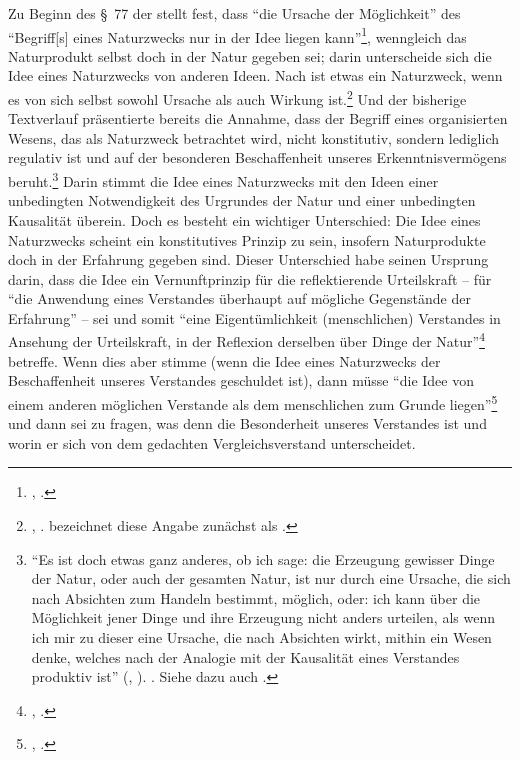 Zu Beginn des \S~77 der  stellt
 fest, dass \enquote{die Ursache der Möglichkeit} des
\enquote{Begriff[s] eines Naturzwecks {\punkt} nur in der Idee liegen
kann}\footnote{\cite[][\S~77]{Kant:KritikderUrteilskraft2009}, \cite[][V:
405.9--12]{Kant:GesammelteWerke1900ff.}.}, wenngleich das
Naturprodukt selbst doch in der Natur gegeben sei; darin unterscheide sich die
Idee eines Naturzwecks von anderen Ideen.
Nach  ist etwas ein Naturzweck, wenn es von sich selbst
sowohl Ursache als auch Wirkung
ist.\footnote{\cite[Vgl.][\S~64]{Kant:KritikderUrteilskraft2009},
\cite[][V: 370.35--37]{Kant:GesammelteWerke1900ff.}. 
bezeichnet diese Angabe zunächst als .}
Und der bisherige Textverlauf präsentierte bereits die Annahme, dass der Begriff
eines organisierten Wesens, das als Naturzweck betrachtet wird, nicht
konstitutiv, sondern lediglich regulativ
ist und auf der besonderen Beschaffenheit unseres Erkenntnisvermögens
beruht.\footnote{\enquote{Es ist doch etwas ganz anderes, ob ich sage: die
Erzeugung gewisser Dinge der Natur, oder auch der gesamten Natur, ist nur durch
eine Ursache, die sich nach Absichten zum Handeln bestimmt, möglich, oder: ich
kann 
über die Möglichkeit jener Dinge und ihre Erzeugung nicht anders urteilen, als
wenn ich mir zu dieser eine Ursache, die nach Absichten wirkt, mithin ein Wesen
denke, welches nach der Analogie mit der Kausalität eines Verstandes produktiv
ist} \mkbibparens{\cite[][\S~75]{Kant:KritikderUrteilskraft2009},
\cite[][V: 397.31--398.3]{Kant:GesammelteWerke1900ff.}}.
\cite[Vgl.][\pno~385\,f.]{Guyer:FromNaturetoMorality2001}.
Siehe dazu auch \cite{Stolzenberg:OrganismusundUrteilskraft2001}.}
Darin stimmt die Idee eines Naturzwecks mit den Ideen einer
unbedingten Notwendigkeit des Urgrundes der Natur und einer unbedingten
Kausalität überein. Doch es besteht ein wichtiger Unterschied: Die Idee eines
Naturzwecks scheint ein konstitutives Prinzip zu sein, insofern Naturprodukte
doch in der Erfahrung gegeben sind. Dieser Unterschied habe seinen Ursprung
darin, dass die Idee ein Vernunftprinzip für die reflektierende Urteilskraft --
für \enquote{die Anwendung eines Verstandes überhaupt auf mögliche Gegenstände
der Erfahrung} -- sei und somit \enquote{eine Eigentümlichkeit 
(menschlichen) Verstandes in Ansehung der Urteilskraft, in der Reflexion
derselben über Dinge der
Natur}\footnote{\cite[][\S~77]{Kant:KritikderUrteilskraft2009}, \cite[][V:
405.25--27]{Kant:GesammelteWerke1900ff.}.} betreffe. Wenn dies aber stimme
(wenn die Idee eines Naturzwecks der Beschaffenheit unseres Verstandes
geschuldet ist), dann müsse \enquote{die Idee von einem anderen möglichen
Verstande als dem menschlichen zum Grunde
liegen}\footnote{\cite[][\S~77]{Kant:KritikderUrteilskraft2009},
\cite[][V: 405.27--28]{Kant:GesammelteWerke1900ff.}.} und dann sei zu fragen, was
denn die Besonderheit unseres Verstandes ist und worin er sich von dem gedachten
Vergleichsverstand unterscheidet.

